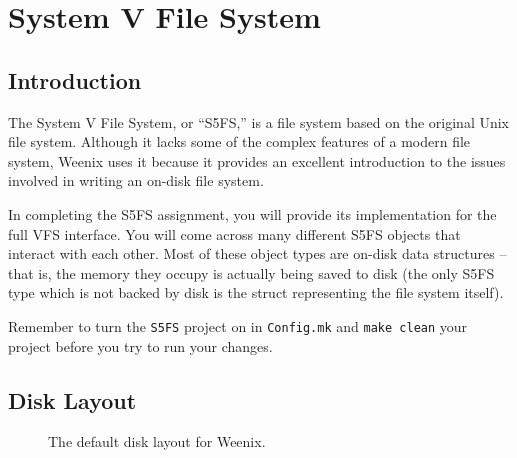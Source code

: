 \chapter{System V File System}
\label{s5fs}

\section{Introduction}

The System V File System, or ``S5FS,'' is a file system based on the original Unix file system.  Although it lacks some of the complex features of a modern file system, Weenix uses it because it provides an excellent introduction to the issues involved in writing an on-disk file system.

In completing the S5FS assignment, you will provide its implementation for the full VFS interface.  You will come across many different S5FS objects that interact with each other.  Most of these object types are on-disk data structures -- that is, the memory they occupy is actually being saved to disk (the only S5FS type which is not backed by disk is the struct representing the file system itself).

Remember to turn the \texttt{S5FS} project on in \texttt{Config.mk} and \texttt{make clean} your project before you try to run your changes.
\section{Disk Layout}

\begin{figure}
    \centering
    \caption{The default disk layout for Weenix.}
\end{figure}

